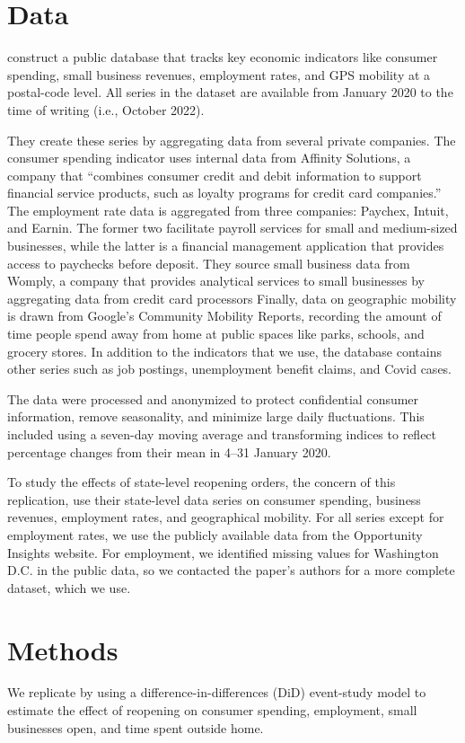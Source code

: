 \documentclass[12pt,letterpaper]{article}
\begin{document}
\section*{Data}
\citeauthor{Chetty2020} construct a public database that tracks key economic indicators like consumer spending, small business revenues, employment rates, and GPS mobility at a postal-code level. All series in the dataset are available from January 2020 to the time of writing (i.e., October 2022). 

They create these series by aggregating data from several private companies. The consumer spending indicator uses internal data from Affinity Solutions, a company that “combines consumer credit and debit information to support financial service products, such as loyalty programs for credit card companies.” The employment rate data is aggregated from three companies: Paychex, Intuit, and Earnin. The former two facilitate payroll services for small and medium-sized businesses, while the latter is a financial management application that provides access to paychecks before deposit. They source small business data  from Womply, a company that provides analytical services to small businesses by aggregating data from credit card processors Finally, data on geographic mobility is drawn from Google’s Community Mobility Reports, recording the amount of time people spend away from home at public spaces like parks, schools, and grocery stores. In addition to the indicators that we use, the database contains other series such as job postings, unemployment benefit claims, and Covid cases.

The data were processed and anonymized to protect confidential consumer information, remove seasonality, and minimize large daily fluctuations. This included using a seven-day moving average and transforming indices to reflect percentage changes from their mean in 4--31 January 2020.  

To study the effects of state-level reopening orders, the concern of this replication, \citeauthor{Chetty2020} use their state-level data series on consumer spending, business revenues, employment rates, and geographical mobility. For all series except for employment rates, we use the publicly available data from the Opportunity Insights website. For employment, we identified missing values for Washington D.C. in the public data, so we contacted the paper’s authors for a more complete dataset, which we use.

\section*{Methods}
We replicate \citeauthor{Chetty2020} by using a difference-in-differences (DiD) event-study model to estimate the effect of reopening on consumer spending, employment, small businesses open, and time spent outside home. 
\end{document}
